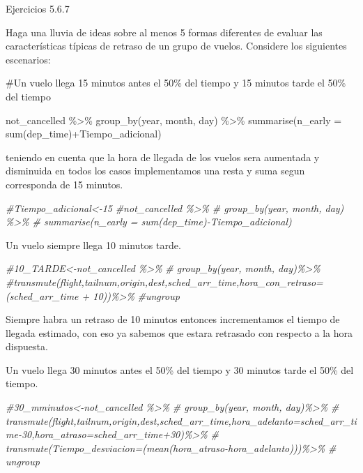 \documentclass[
]{article}
\newenvironment{Shaded}{\begin{snugshade}}{\end{snugshade}}
\newcommand{\CommentTok}[1]{\textcolor[rgb]{0.56,0.35,0.01}{\textit{#1}}}
\newcommand{\NormalTok}[1]{#1}
\begin{document}
Ejercicios 5.6.7

Haga una lluvia de ideas sobre al menos 5 formas diferentes de evaluar
las características típicas de retraso de un grupo de vuelos. Considere
los siguientes escenarios:

\#Un vuelo llega 15 minutos antes el 50\% del tiempo y 15 minutos tarde
el 50\% del tiempo

\begin{Shaded}
\begin{Highlighting}[]
\NormalTok{not\_cancelled \%\textgreater{}\%}
\NormalTok{  group\_by(year, month, day) \%\textgreater{}\%}
\NormalTok{  summarise(n\_early = sum(dep\_time)+Tiempo\_adicional)}
\end{Highlighting}
\end{Shaded}

teniendo en cuenta que la hora de llegada de los vuelos sera aumentada y
disminuida en todos los casos implementamos una resta y suma segun
corresponda de 15 minutos.

\begin{Shaded}
\begin{Highlighting}[]
\CommentTok{\#Tiempo\_adicional\textless{}{-}15}
\CommentTok{\#not\_cancelled \%\textgreater{}\%}
\CommentTok{\#  group\_by(year, month, day) \%\textgreater{}\%}
\CommentTok{\#  summarise(n\_early = sum(dep\_time){-}Tiempo\_adicional)}
\end{Highlighting}
\end{Shaded}

Un vuelo siempre llega 10 minutos tarde.

\begin{Shaded}
\begin{Highlighting}[]
\CommentTok{\#\textquotesingle{}10\_TARDE\textquotesingle{}\textless{}{-}not\_cancelled \%\textgreater{}\%}
\CommentTok{\#  group\_by(year, month, day)\%\textgreater{}\%}
\CommentTok{\#transmute(flight,tailnum,origin,dest,sched\_arr\_time,hora\_con\_retraso=(sched\_arr\_time + 10))\%\textgreater{}\%}
\CommentTok{\#ungroup}
\end{Highlighting}
\end{Shaded}

Siempre habra un retraso de 10 minutos entonces incrementamos el tiempo
de llegada estimado, con eso ya sabemos que estara retrasado con
respecto a la hora dispuesta.

Un vuelo llega 30 minutos antes el 50\% del tiempo y 30 minutos tarde el
50\% del tiempo.

\begin{Shaded}
\begin{Highlighting}[]
\CommentTok{\#\textquotesingle{}30\_mminutos\textquotesingle{}\textless{}{-}not\_cancelled \%\textgreater{}\%}
\CommentTok{\#  group\_by(year, month, day)\%\textgreater{}\%}
\CommentTok{\#  transmute(flight,tailnum,origin,dest,sched\_arr\_time,hora\_adelanto=sched\_arr\_time{-}30,hora\_atraso=sched\_arr\_time+30)\%\textgreater{}\%}
\CommentTok{\#  transmute(Tiempo\_desviacion=(mean(hora\_atraso{-}hora\_adelanto)))\%\textgreater{}\%}
\CommentTok{\#  ungroup}
\end{Highlighting}
\end{Shaded}
\end{document}
